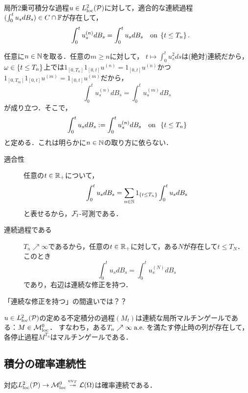 \documentclass[uplatex,dvipdfmx]{jsreport}
\begin{document}
\begin{proposition}
    局所2乗可積分な過程$u\in L^2_{\mathrm{loc}}(\mathcal{P})$に対して，適合的な連続過程$(\int^t_0u_sdB_s)\in C\cap\mathbb{F}$が存在して，
    \[\quad\int^t_0u_s^{(n)}dB_s=\int^t_0u_sdB_s\quad\mathrm{on}\;\left\{t\le T_n\right\}.\]
\end{proposition}
\begin{Proof}
    任意に$n\in\mathbb{N}$を取る．任意の$m\ge n$に対して，
    $t\mapsto\int^t_0u_s^2ds$は(絶対)連続だから，
    $\omega\in\left\{t\le T_n\right\}$上では$1_{[0,T_n]}1_{[0,t]}u^{(n)}=1_{[0,t]}u^{(n)}$かつ$1_{[0,T_m]}1_{[0,t]}u^{(m)}=1_{[0,t]}u^{(m)}$だから，
    \[\int^t_0u^{(n)}_sdB_s=\int^t_0u_s^{(m)}dB_s\]
    が成り立つ．そこで，
    \[\int^t_0u_sdB_s:=\int^t_0u_s^{(n)}dB_s\quad\mathrm{on}\;\;\left\{t\le T_n\right\}\]
    と定める．これは明らかに$n\in\mathbb{N}$の取り方に依らない．
    \begin{description}
        \item[適合性] 任意の$t\in\mathbb{R}_+$について，
        \[\int^t_0u_sdB_s=\sum_{n\in\mathbb{N}}1_{\left\{t\le T_n\right\}}\int^t_0u_sdB_s\]
        と表せるから，$\mathcal{F}_t$-可測である．
        \item[連続過程である]
        $T_n\nearrow \infty$であるから，任意の$t\in\mathbb{R}_+$に対して，ある$N$が存在して$t\le T_N$．このとき
        \[\int^t_0u_sdB_s=\int^t_0u^{(N)}_sdB_s\]
        であり，右辺は連続な修正を持つ．
    \end{description}
\end{Proof}
\begin{remarks}
    「連続な修正を持つ」の間違いでは？？
\end{remarks}

\begin{corollary}
    $u\in L^2_{\mathrm{loc}}(\mathcal{P})$の定める不定積分の過程$(M_t)$は連続な局所マルチンゲールである：$M\in\mathcal{M}^0_{\mathrm{loc}}$．
    すなわち，ある$T_n\nearrow\infty\;\mathrm{a.e.}\;$を満たす停止時の列が存在して，各停止過程$M^{T_n}$はマルチンゲールである．
\end{corollary}

\subsection{積分の確率連続性}

\begin{tcolorbox}[colframe=ForestGreen, colback=ForestGreen!10!white,breakable,colbacktitle=ForestGreen!40!white,coltitle=black,fonttitle=\bfseries\sffamily,
title=]
    対応$L^2_{\mathrm{loc}}(\mathcal{P})\to\mathcal{M}^0_{\mathrm{loc}}\overset{\mathrm{ev}_T}{\twoheadrightarrow}\mathcal{L}(\Omega)$は確率連続である．
\end{tcolorbox}
\end{document}
